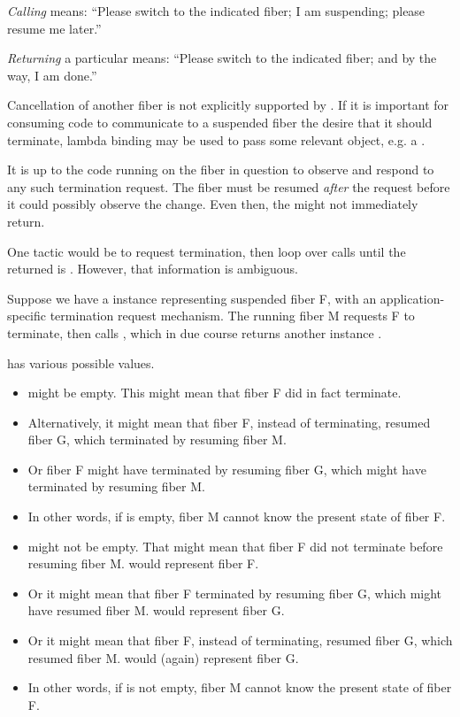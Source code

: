 \emph{Calling} \resume means: ``Please switch to the indicated fiber; I
am suspending; please resume me later.''

\emph{Returning} a particular \fiber means: ``Please switch to the indicated
fiber; and by the way, I am done.''

Cancellation of another fiber is not explicitly supported
by . If it is important for consuming code to communicate
to a suspended fiber the desire that it should terminate, lambda binding may
be used to pass some relevant object, e.g. a .

It is up to the code running on the fiber in question to observe and respond
to any such termination request. The fiber must be resumed \emph{after} the
request before it could possibly observe the change. Even then, the \entryfn
might not immediately return.

One tactic would be to request termination, then loop over \anyresume calls until
the returned \fiber is . However, that information is ambiguous.

Suppose we have a \fiber instance  representing suspended fiber F,
with an application-specific termination request mechanism. The running fiber
M requests F to terminate, then calls , which in due course
returns another \fiber instance .

 has various possible values.

\begin{itemize}
    \item {} might be empty. This might mean that fiber F did in fact
          terminate.
    \item Alternatively, it might mean that fiber F, instead of terminating,
          resumed fiber G, which terminated by resuming fiber M.
    \item Or fiber F might have terminated by resuming fiber G, which might
          have terminated by resuming fiber M.
    \item In other words, if  is empty, fiber M cannot know the
          present state of fiber F.
    \item {} might not be empty. That might mean that fiber F did not
          terminate before resuming fiber M.  would represent fiber F.
    \item Or it might mean that fiber F terminated by resuming fiber G, which
          might have resumed fiber M.  would represent fiber G.
    \item Or it might mean that fiber F, instead of terminating, resumed fiber
          G, which resumed fiber M.  would (again) represent fiber G.
    \item In other words, if  is not empty, fiber M cannot know the
          present state of fiber F.
\end{itemize}

